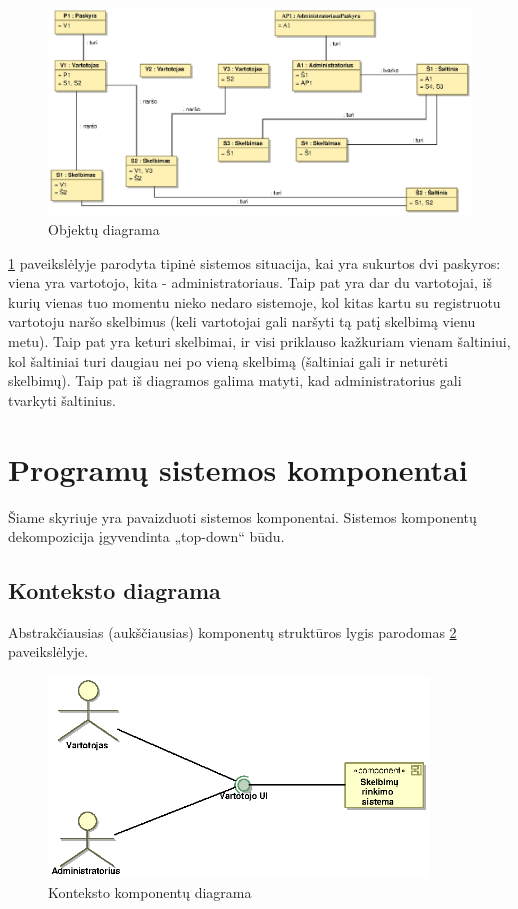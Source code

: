 \documentclass[12pt]{article}
\begin{document}
	\begin{figure}[h]
		\begin{center}
			\includegraphics[width=\textwidth]{ObjektuDiagrama.eps}
			\caption{Objektų diagrama\label{ObjectDiagram}}
		\end{center}
	\end{figure}
	
	 \ref{ObjectDiagram} paveikslėlyje parodyta tipinė sistemos situacija, kai yra sukurtos dvi paskyros: viena yra vartotojo, kita - administratoriaus. Taip pat yra dar du vartotojai, iš kurių vienas tuo momentu nieko nedaro sistemoje, kol kitas kartu su registruotu vartotoju naršo skelbimus (keli vartotojai gali naršyti tą patį skelbimą vienu metu). Taip pat yra keturi skelbimai, ir visi priklauso kažkuriam vienam šaltiniui, kol šaltiniai turi daugiau nei po vieną skelbimą (šaltiniai gali ir neturėti skelbimų). Taip pat iš diagramos galima matyti, kad administratorius gali tvarkyti šaltinius.
	\pagebreak
	
	\section{Programų sistemos komponentai}
	
	Šiame skyriuje yra pavaizduoti sistemos komponentai. Sistemos komponentų dekompozicija įgyvendinta „top-down“ būdu.	
	
	\subsection{Konteksto diagrama}
	Abstrakčiausias (aukščiausias) komponentų struktūros lygis parodomas \ref{Components1} paveikslėlyje.
	\begin{figure}[h]
		\begin{center}
			\includegraphics[width=0.9\textwidth]{Komponentai1.eps}
			\caption{Konteksto komponentų diagrama\label{Components1}}
		\end{center}
	\end{figure}
	
\end{document}
